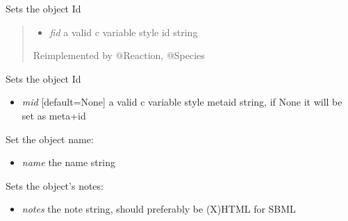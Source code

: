 \documentclass[a4paper,11pt,english]{sphinxmanual}
\begin{document}
\begin{fulllineitems}
\begin{fulllineitems}
\end{fulllineitems}


\begin{fulllineitems}
\label{modules_doc:cbmpy.CBModel.Fbase.setId}
Sets the object Id
\begin{quote}
\begin{itemize}
\item {} 
\emph{fid} a valid c variable style id string

\end{itemize}

Reimplemented by @Reaction, @Species
\end{quote}

\end{fulllineitems}


\begin{fulllineitems}
\label{modules_doc:cbmpy.CBModel.Fbase.setMetaId}
Sets the object Id
\begin{itemize}
\item {} 
\emph{mid} {[}default=None{]} a valid c variable style metaid string, if None it will be set as meta+id

\end{itemize}

\end{fulllineitems}


\begin{fulllineitems}
\label{modules_doc:cbmpy.CBModel.Fbase.setName}
Set the object name:
\begin{itemize}
\item {} 
\emph{name} the name string

\end{itemize}

\end{fulllineitems}


\begin{fulllineitems}
\label{modules_doc:cbmpy.CBModel.Fbase.setNotes}
Sets the object's notes:
\begin{itemize}
\item {} 
\emph{notes} the note string, should preferably be (X)HTML for SBML


\end{itemize}
\end{fulllineitems}
\end{fulllineitems}
\end{document}
